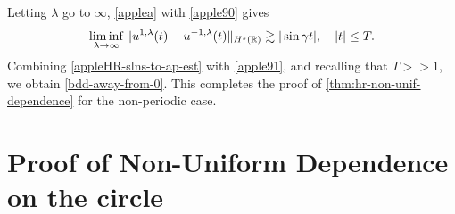 %
%
%
%
Letting $\lambda$ go to $\infty$,  \cref{applea}
with \eqref{apple90}  gives
%
%
%
%
\begin{equation} \label{apple91}
\liminf_{\lambda \to\infty}
\|
u^{1,\lambda}(t)
-
u^{- 1,\lambda}(t)
\|_{H^s(\mathbb{R})}
\gtrsim
|\sin \gamma t|, \quad |t| \le T.
\end{equation}
%
%
Combining \eqref{appleHR-slns-to-ap-est} with \eqref{apple91}, and 
recalling that $T >>1$, we obtain \eqref{bdd-away-from-0}. This completes 
the proof of \cref{thm:hr-non-unif-dependence} for the
non-periodic case. \qquad \qedsymbol
%
%
%
%
%
%
%
%
\section{Proof of Non-Uniform Dependence 
on the circle}
\label{sec:3}

